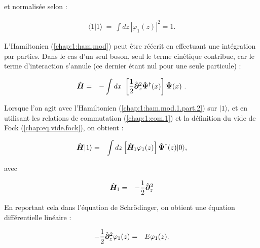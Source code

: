 et normalisée selon :

\begin{eqnarray}
	\langle 1 \vert 1 \rangle ~=~ \int dz\,  |\varphi_1(z)|^2 = 1.
\end{eqnarray}

L'Hamiltonien (\ref{chap:1:ham.mod}) peut être réécrit en effectuant une intégration par parties. Dans le cas d'un seul boson, seul le terme cinétique contribue, car le terme d'interaction s'annule (ce dernier étant nul pour une seule particule) :


\begin{eqnarray}
	\operator{H} & = & -\int dx  \left [\frac{1}{2}\operator{\partial}_x^2 \operator{\Psi}^\dag(x)\right ] \operator{\Psi}(x)  \label{chap:1:ham.mod.1.part.2}.
\end{eqnarray}

Lorsque l’on agit avec l’Hamiltonien (\ref{chap:1:ham.mod.1.part.2}) sur \(\vert 1 \rangle\), et en utilisant les relations de commutation (\ref{chap:1:com.1}) et la définition du vide de Fock (\ref{chap:eq.vide.fock}), on obtient : 

\begin{eqnarray}
	\hat{\bm{H}}\vert 1 \rangle & = & \int dz \left [\hat{\bm{H}}_1  \varphi_{1}(z)  \right ] \hat{\bm{\Psi}}^\dag (z)	 \vert 0 \rangle,	
\end{eqnarray}

avec 

\begin{eqnarray*}
		\hat{\bm{H}}_1 & = & - \frac{1}{2} \hat{\bm{\partial}}_z^2
\end{eqnarray*}

En reportant cela dans l’équation de Schrödinger, on obtient une équation différentielle linéaire :

\begin{eqnarray}
	- \frac{1}{2} \hat{\bm{\partial}}_z^2 \varphi_1(z) & = & E \varphi_1(z). \label{chap:eq.onebody.schrod}
\end{eqnarray}





